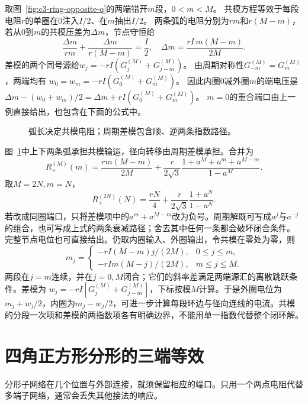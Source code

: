 \begin{solution}
取图~\ref{fig:c3-ring-opposite-q}的两端错开$m$段，$0<m<M$。
共模方程等效于每段电阻$r$的单圈在$0$注入$I/2$、在$m$抽出$I/2$。
两条弧的电阻分别为$rm$和$r(M-m)$，若从$0$到$m$的共模压差为$\Delta m$，节点守恒给
\[
 \frac{\Delta m}{rm}+\frac{\Delta m}{r(M-m)}=\frac I2,
 \quad \Delta m=\frac{rI\,m(M-m)}{2M}.
\]
差模的两个同号源给$w_j=-rI(G_j^{(M)}+G_{j-m}^{(M)})$。
由周期对称性$G_{-m}^{(M)}=G_m^{(M)}$，两端均有
$w_0=w_m=-rI(G_0^{(M)}+G_m^{(M)})$。
因此内圈$0$减外圈$m$的端电压是
$\Delta m-(w_0+w_m)/2=\Delta m+rI(G_0^{(M)}+G_m^{(M)})$。
$m=0$的重合端口由上一例直接给出，也包含在下面的公式中。

\begin{figure}[H]\centering
{}
\caption{弧长决定共模电阻；周期差模包含顺、逆两条指数路径。}\label{fig:c3-ring-opposite-s}
\end{figure}

图~\ref{fig:c3-ring-opposite-s}中上下两条弧承担共模输运，径向转移由周期差模承担。合并为
\[
 R_\times^{(M)}(m)=\frac{rm(M-m)}{2M}
 +\frac r{2\sqrt3}
 \frac{1+a^M+a^m+a^{M-m}}{1-a^M}.
\]
取$M=2N,m=N$，
\[
 \boxed{R_\times^{(2N)}(N)=\frac{rN}4+
 \frac r{2\sqrt3}\frac{1+a^N}{1-a^N}}.
\]
若改成同圈端口，只将差模项中的$a^m+a^{M-m}$改为负号。周期解既可写成$a^j$与$a^{-j}$的组合，也可写成上式的两条衰减路径；舍去其中任何一条都会破坏闭合条件。
完整节点电位也可直接给出。仍取内圈输入、外圈输出，令共模在零处为零，则
\[
 m_j=\begin{cases}
 -rI(M-m)j/(2M),&0\le j\le m,\\
 -rIm(M-j)/(2M),&m\le j\le M.
 \end{cases}
\]
两段在$j=m$连续，并在$j=0,M$闭合；它们的斜率差满足两端源汇的离散跳跃条件。差模为
$w_j=-rI[G_j^{(M)}+G_{j-m}^{(M)}]$，下标按模$M$计算。于是外圈电位为$m_j+w_j/2$，内圈为$m_j-w_j/2$，可进一步计算每段环边与径向连线的电流。共模的分段一次项和差模的两指数项各有明确边界，不能用单一指数代替整个闭环解。
\end{solution}



\section{四角正方形分形的三端等效}
分形子网络在几个位置与外部连接，就须保留相应的端口。只用一个两点电阻代替多端子网络，通常会丢失其他接法的响应。

